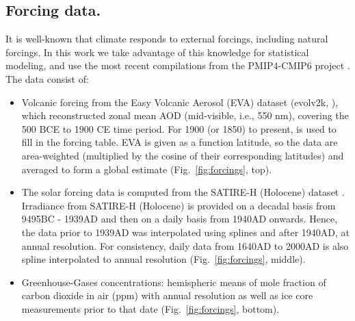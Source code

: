 \documentclass[12pt]{amsart}
\theoremstyle{plain}
\theoremstyle{definition}
\theoremstyle{remark}
\begin{document}
\subsection{Forcing data.}
It is well-known that climate responds to external forcings, including natural forcings. In this work we take advantage of this knowledge for statistical modeling, and use the most recent compilations from the PMIP4-CMIP6 project \citep{JungclausGMD17,Kageyama_GMD2017}. The data consist of:
\begin{itemize}
\item Volcanic forcing from the Easy Volcanic Aerosol (EVA) dataset (evolv2k,
  \cite{Toohey2016}), which reconstructed zonal mean AOD (mid-visible, i.e., 550 nm), covering the
  500 BCE to 1900 CE time period. For 1900 (or 1850) to present, \cite{Thomason2016} is
  used to fill in the forcing table. EVA is given as a function latitude, so the data are area-weighted (multiplied by the cosine of their corresponding latitudes) and averaged to form a global estimate (Fig.~\ref{fig:forcings}, top).
  
\item The solar forcing data is computed from the SATIRE-H
  (Holocene) dataset \citep{Vieira2011}. Irradiance from SATIRE-H (Holocene) is
  provided on a decadal basis from 9495BC - 1939AD and then on a daily basis
  from 1940AD onwards. Hence, the data prior to 1939AD was interpolated using splines and after 1940AD, at annual resolution. For consistency, daily data from 1640AD to 2000AD is also spline interpolated to annual resolution (Fig.~\ref{fig:forcings}, middle). 
\item Greenhouse-Gases concentrations: hemispheric means of mole
  fraction of carbon dioxide in air (ppm) with annual
  resolution \citep{Meinshausen_GMD2017} as well as ice core measurements prior to that date \citep{JungclausGMD17} (Fig.~\ref{fig:forcings}, bottom).
\end{itemize}
\end{document}
